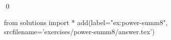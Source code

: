 
\begin{ex} 
  \label{ex:power-summ8}
  
  \qed
\end{ex} 
\begin{python0}
from solutions import *
add(label="ex:power-summ8",
    srcfilename='exercises/power-summ8/answer.tex') 
\end{python0}
